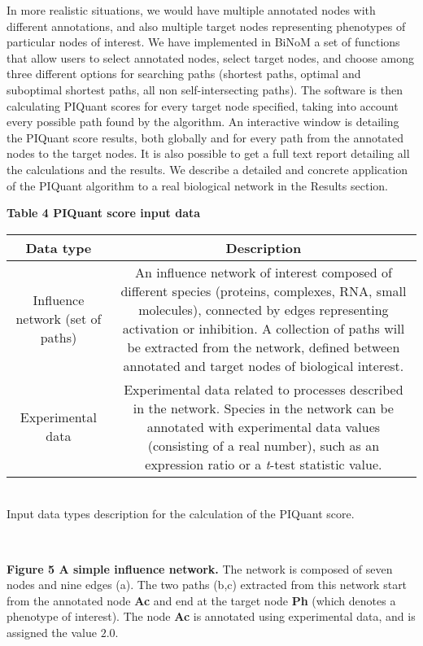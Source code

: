 \documentclass[11pt]{bmc_article_s50}
\newenvironment{bmcformat}{\begin{raggedright}\baselineskip20pt\sloppy\setboolean{publ}{false}}{\end{raggedright}\baselineskip20pt\sloppy}
\begin{document}
\begin{bmcformat}
In more realistic situations, we would have multiple annotated nodes with different
 annotations, and also multiple target nodes representing phenotypes of
particular nodes of interest. We have implemented in BiNoM a set of functions
that allow users to select annotated nodes, select target nodes, and choose among
three different options for searching paths (shortest paths, optimal and
suboptimal shortest paths, all non self-intersecting paths). The software is then
calculating PIQuant scores for every target node specified, taking into account
every possible path found by the algorithm. An interactive window is detailing
the PIQuant score results, both globally and for every path from the annotated
nodes to the target nodes. It is also possible to get a full text report
detailing all the calculations and the results. We describe a detailed
and concrete application of the PIQuant algorithm to a real biological network
in the Results section.

\begin{table}[!h]
  \textbf{Table 4 PIQuant score input data}

      \begin{tabular*}{\textwidth}{@{\extracolsep\fill}cc}
        \hline
    \textbf{Data type} & \textbf{Description} \\
    \hline
        Influence network (set of paths) & \parbox{10cm}{\null An influence network of
interest composed of different species (proteins, complexes, RNA, small
molecules), connected by edges representing activation or inhibition. A
collection of paths will be extracted from the network, defined between annotated
and target nodes of biological interest.\null} \\
\hline
        Experimental data & \parbox{10cm}{\null Experimental data related to
processes described in the network. Species in the network can be annotated with
experimental data values (consisting of a real number), such as an expression
ratio or a \textit{t}-test statistic value.\null}  \\
\hline
      \end{tabular*}\\
       Input data types description for the calculation of the PIQuant score.
      \end{table}


\hrulefill\

\vspace*{-15pt}
\textbf{Figure 5 A simple influence network.}
The network is composed of seven nodes and nine edges (a). The two paths (b,c)
extracted from this network start from the annotated node \textbf{Ac} and end at
the target node \textbf{Ph} (which denotes a phenotype of interest). The node
\textbf{Ac} is annotated using experimental data, and is assigned the
value $2.0$.


\end{bmcformat}
\end{document}
